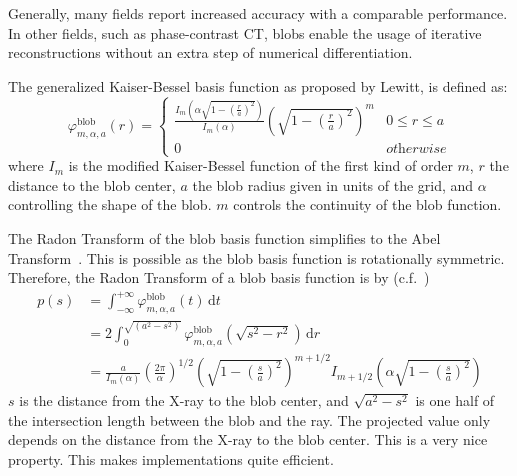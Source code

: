 Generally, many fields report increased accuracy with a comparable performance. In other fields,
such as phase-contrast CT, blobs enable the usage of iterative reconstructions without an extra step
of numerical differentiation.

The generalized Kaiser-Bessel basis function as proposed by Lewitt, is defined as:
\begin{equation}\label{eq:blob_basis_fn}
	\varphi^{\text{blob}}_{m, \alpha, a}(r) =
	\begin{cases}
		\frac{I_m\left( \alpha \sqrt{1 - \left(\frac{r}{a}\right)^2} \right)} {I_m\left( \alpha \right)} \left( \sqrt{1 - \left(\frac{r}{a}\right)^2}\right)^m & 0 \le r \le a      \\
		0                                                                                                                                                      & \textit{otherwise}
	\end{cases}
\end{equation}
where \(I_m\) is the modified Kaiser-Bessel function of the first kind of order \(m\), \(r\) the
distance to the blob center, \(a\) the blob radius given in units of the grid, and \(\alpha\)
controlling the shape of the blob. \(m\) controls the continuity of the blob function.

The Radon Transform  of the blob basis function simplifies to the Abel
Transform~\cite{buzug_computed_2008}. This is possible as the blob basis function is rotationally
symmetric. Therefore, the Radon Transform of a blob basis function is by
(c.f.~\cite{lewitt_multidimensional_1990,lewitt_alternatives_1992})
\begin{align}\label{eq:radon_blob_basis}
	p(s) & = \int_{-\infty}^{+\infty} \varphi^{\text{blob}}_{m, \alpha, a}\left(t\right) \, \mathrm{d} t                                                                                                       \\
	     & = 2 \int_0^{\sqrt{(a^2-s^2)}} \varphi^{\text{blob}}_{m, \alpha, a}\left(\sqrt{s^2 - r^2}\right) \, \mathrm{d} r                                                                                     \\
	     & = \frac{a}{I_m(\alpha)} \left( \frac{2\pi}{\alpha}\right)^{1/2} \left( \sqrt{1 - \left(\frac{s}{a}\right)^2} \right)^{m + 1/2} I_{m+1/2}\left( \alpha \sqrt{1 - \left(\frac{s}{a}\right)^2} \right)
\end{align}
\(s\) is the distance from the X-ray to the blob center, and \(\sqrt{a^2 - s^2}\) is one half of the
intersection length between the blob and the ray. The projected value only depends on the distance
from the X-ray to the blob center. This is a very nice property. This makes implementations quite
efficient.

